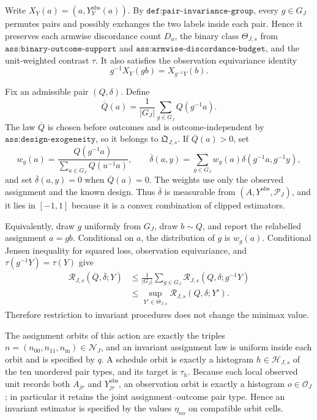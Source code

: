Write \(X_Y(a)=(a,Y_Y^{\mathrm{obs}}(a))\). By \(\texttt{def:pair-invariance-group}\), every \(g\in G_J\) permutes pairs and possibly exchanges the two labels inside each pair. Hence it preserves each armwise discordance count \(D_a\), the binary class \(\Theta_{J,s}\) from \(\texttt{ass:binary-outcome-support}\) and \(\texttt{ass:armwise-discordance-budget}\), and the unit-weighted contrast \(\tau\). It also satisfies the observation equivariance identity
\[
 g^{-1}X_Y(gb)=X_{g^{-1}Y}(b).
\]

Fix an admissible pair \((Q,\delta)\). Define
\[
 \overline Q(a)=\frac1{|G_J|}\sum_{g\in G_J}Q(g^{-1}a).
\]
The law \(\overline Q\) is chosen before outcomes and is outcome-independent by \(\texttt{ass:design-exogeneity}\), so it belongs to \(\mathfrak Q_{J,s}\). If \(\overline Q(a)>0\), set
\[
 w_g(a)=\frac{Q(g^{-1}a)}{\sum_{u\in G_J}Q(u^{-1}a)},
 \qquad
 \overline\delta(a,y)=\sum_{g\in G_J}w_g(a)\delta(g^{-1}a,g^{-1}y),
\]
and set \(\overline\delta(a,y)=0\) when \(\overline Q(a)=0\). The weights use only the observed assignment and the known design. Thus \(\overline\delta\) is measurable from \((A,Y^{\mathrm{obs}},\mathcal P_J)\), and it lies in \([-1,1]\) because it is a convex combination of clipped estimators.

Equivalently, draw \(g\) uniformly from \(G_J\), draw \(b\sim Q\), and report the relabelled assignment \(a=gb\). Conditional on \(a\), the distribution of \(g\) is \(w_g(a)\). Conditional Jensen inequality for squared loss, observation equivariance, and \(\tau(g^{-1}Y)=\tau(Y)\) give
\[
\begin{aligned}
 \mathcal R_{J,s}(\overline Q,\overline\delta;Y)
 &\le \frac1{|G_J|}\sum_{g\in G_J}
 \mathcal R_{J,s}(Q,\delta;g^{-1}Y)\\
 &\le \sup_{Y'\in\Theta_{J,s}}\mathcal R_{J,s}(Q,\delta;Y').
\end{aligned}
\]
Therefore restriction to invariant procedures does not change the minimax value.

The assignment orbits of this action are exactly the triples \(n=(n_{00},n_{11},n_{\mathrm m})\in\mathcal N_J\), and an invariant assignment law is uniform inside each orbit and is specified by \(q\). A schedule orbit is exactly a histogram \(h\in\mathcal H_{J,s}\) of the ten unordered pair types, and its target is \(\tau_h\). Because each local observed unit records both \(A_{jr}\) and \(Y^{\mathrm{obs}}_{jr}\), an observation orbit is exactly a histogram \(o\in\mathcal O_J\); in particular it retains the joint assignment--outcome pair type. Hence an invariant estimator is specified by the values \(\eta_{no}\) on compatible orbit cells.

